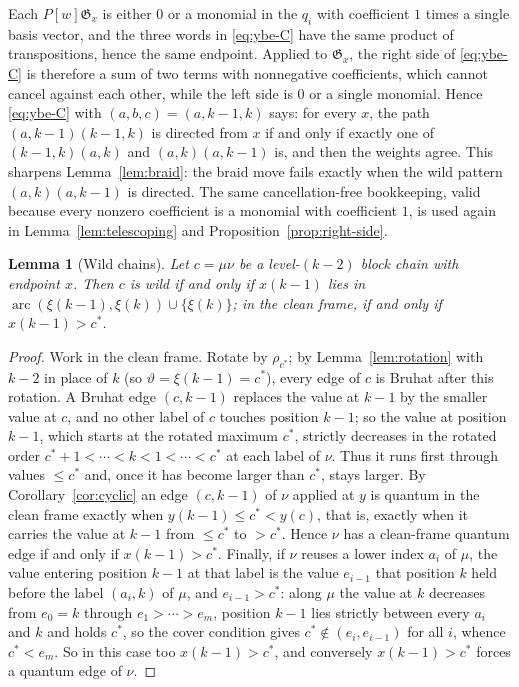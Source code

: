 \documentclass[11pt]{article}
\newtheorem{lemma}[proposition]{Lemma}
\newcommand{\G}{\mathfrak{G}}
\begin{document}
Each $P[w]\G_x$ is either $0$ or a monomial in the $q_i$ with
coefficient $1$ times a single basis vector, and the three words in
\eqref{eq:ybe-C} have the same product of transpositions, hence the
same endpoint. Applied to $\G_x$, the right side of \eqref{eq:ybe-C}
is therefore a sum of two terms with nonnegative coefficients, which
cannot cancel against each other, while the left side is $0$ or a
single monomial. Hence \eqref{eq:ybe-C} with $(a,b,c)=(a,k-1,k)$ says:
for every $x$, the path $(a,k-1)(k-1,k)$ is directed from $x$ if and
only if exactly one of $(k-1,k)(a,k)$ and $(a,k)(a,k-1)$ is, and then
the weights agree. This sharpens Lemma~\ref{lem:braid}: the braid
move fails exactly when the wild pattern $(a,k)(a,k-1)$ is directed.
The same cancellation-free bookkeeping, valid because every nonzero
coefficient is a monomial with coefficient $1$, is used again in
Lemma~\ref{lem:telescoping} and Proposition~\ref{prop:right-side}.

\begin{lemma}[Wild chains]\label{lem:wild-char}
Let $c=\mu\nu$ be a level-$(k-2)$ block chain with endpoint $x$. Then
$c$ is wild if and only if $x(k-1)$ lies in
$\operatorname{arc}(\xi(k-1),\xi(k))\cup\{\xi(k)\}$; in the clean
frame, if and only if $x(k-1)>c^\ast$.
\end{lemma}

\begin{proof}
Work in the clean frame. Rotate by $\rho_{c^\ast}$; by
Lemma~\ref{lem:rotation} with $k-2$ in place of $k$ (so
$\vartheta=\xi(k-1)=c^\ast$), every edge of $c$ is Bruhat after this
rotation. A Bruhat edge $(c,k-1)$ replaces the value at $k-1$ by the
smaller value at $c$, and no other label of $c$ touches position
$k-1$; so the value at position $k-1$, which starts at the rotated
maximum $c^\ast$, strictly decreases in the rotated order
$c^\ast+1<\cdots<k<1<\cdots<c^\ast$ at each label of $\nu$. Thus it runs first through values $\leq c^\ast$ and, once it
has become larger than $c^\ast$, stays larger. By
Corollary~\ref{cor:cyclic} an edge $(c,k-1)$ of $\nu$ applied at $y$
is quantum in the clean frame exactly when $y(k-1)\leq c^\ast<y(c)$,
that is, exactly when it carries the value at $k-1$ from $\leq c^\ast$
to $>c^\ast$. Hence $\nu$ has a clean-frame quantum edge if and only
if $x(k-1)>c^\ast$. Finally, if $\nu$ reuses a lower index $a_i$ of
$\mu$, the value entering position $k-1$ at that label is the value
$e_{i-1}$ that position $k$ held before the label $(a_i,k)$ of $\mu$,
and $e_{i-1}>c^\ast$: along $\mu$ the value at $k$ decreases from
$e_0=k$ through $e_1>\cdots>e_m$, position $k-1$ lies strictly between
every $a_i$ and $k$ and holds $c^\ast$, so the cover condition gives
$c^\ast\notin(e_i,e_{i-1})$ for all $i$, whence $c^\ast<e_m$. So in
this case too $x(k-1)>c^\ast$, and conversely $x(k-1)>c^\ast$ forces a
quantum edge of $\nu$.
\end{proof}
\end{document}
